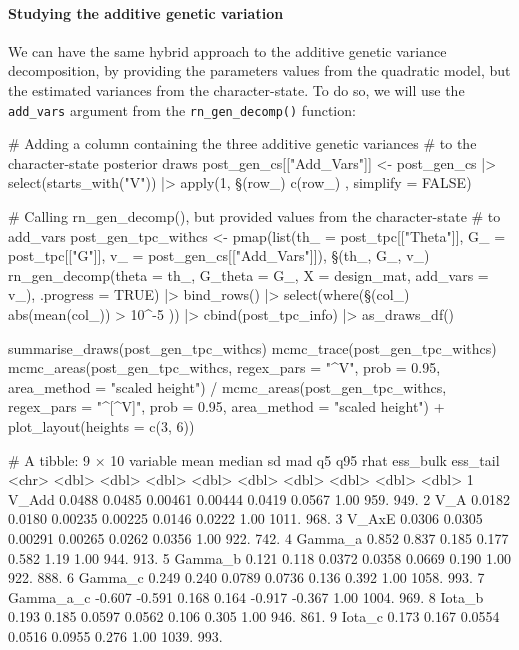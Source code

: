 \documentclass[a4paper,12pt,twoside]{article}
\begin{document}
\paragraph{Studying the additive genetic variation}
We can have the same hybrid approach to the additive genetic variance decomposition, by providing the parameters values from the quadratic model, but the estimated variances from the character-state. To do so, we will use the \texttt{add\_vars} argument from the \texttt{rn\_gen\_decomp()} function:
\begin{Rinput}
# Adding a column containing the three additive genetic variances
# to the character-state posterior draws
post_gen_cs[["Add_Vars"]] <-
    post_gen_cs |>
    select(starts_with("V")) |>
    apply(1, \§§(row_) { c(row_) }, simplify = FALSE)

# Calling rn_gen_decomp(), but provided values from the character-state
# to add_vars
post_gen_tpc_withcs <-
    pmap(list(th_ = post_tpc[["Theta"]],
              G_  = post_tpc[["G"]],
              v_  = post_gen_cs[["Add_Vars"]]),
         \§§(th_, G_, v_) rn_gen_decomp(theta    = th_,
                                      G_theta  = G_,
                                      X        = design_mat,
                                      add_vars = v_),
         .progress = TRUE) |>
    bind_rows()  |>
    select(where(\§§(col_) { abs(mean(col_)) > 10^-5 })) |>
    cbind(post_tpc_info) |>
    as_draws_df()

summarise_draws(post_gen_tpc_withcs)
mcmc_trace(post_gen_tpc_withcs)
mcmc_areas(post_gen_tpc_withcs,
           regex_pars = "^V",
           prob = 0.95,
           area_method = "scaled height") /
    mcmc_areas(post_gen_tpc_withcs,
               regex_pars = "^[^V]",
               prob = 0.95,
               area_method = "scaled height") +
    plot_layout(heights = c(3, 6))
\end{Rinput}
\begin{Routput}
# A tibble: 9 × 10
  variable     mean  median      sd     mad      q5     q95  rhat ess_bulk ess_tail
  <chr>       <dbl>   <dbl>   <dbl>   <dbl>   <dbl>   <dbl> <dbl>    <dbl>    <dbl>
1 V_Add      0.0488  0.0485 0.00461 0.00444  0.0419  0.0567  1.00     959.     949.
2 V_A        0.0182  0.0180 0.00235 0.00225  0.0146  0.0222  1.00    1011.     968.
3 V_AxE      0.0306  0.0305 0.00291 0.00265  0.0262  0.0356  1.00     922.     742.
4 Gamma_a    0.852   0.837  0.185   0.177    0.582   1.19    1.00     944.     913.
5 Gamma_b    0.121   0.118  0.0372  0.0358   0.0669  0.190   1.00     922.     888.
6 Gamma_c    0.249   0.240  0.0789  0.0736   0.136   0.392   1.00    1058.     993.
7 Gamma_a_c -0.607  -0.591  0.168   0.164   -0.917  -0.367   1.00    1004.     969.
8 Iota_b     0.193   0.185  0.0597  0.0562   0.106   0.305   1.00     946.     861.
9 Iota_c     0.173   0.167  0.0554  0.0516   0.0955  0.276   1.00    1039.     993.
\end{Routput}
\end{document}
